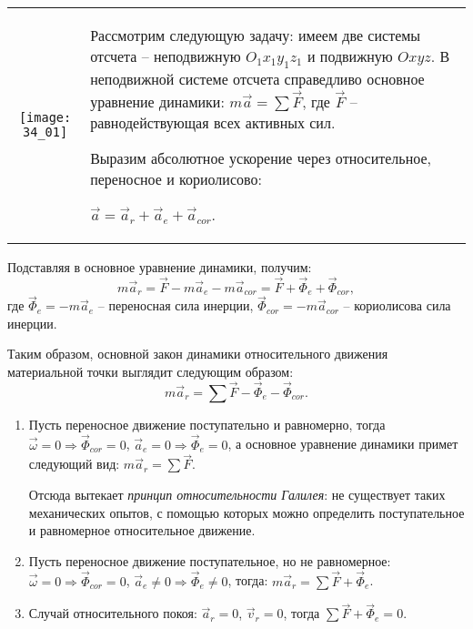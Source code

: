 
\begin{table}[h!]
\begin{tabular}{C{.4}m{.55\textwidth}}
\texttt{[image: 34\_01]} &
Рассмотрим следующую задачу: имеем две системы отсчета -- неподвижную
\( O_1x_1y_1z_1 \) и подвижную \( Oxyz \). В неподвижной системе отсчета
справедливо основное уравнение динамики: \( m\vec{a} = \sum\vec{F} \), где
\( \vec{F} \) -- равнодействующая всех активных сил.

Выразим абсолютное ускорение через относительное, переносное и кориолисово:

\( \vec{a} = \vec{a}_r + \vec{a}_e +\vec{a}_{cor} \). 
\end{tabular}
\end{table}

Подставляя в основное уравнение динамики, получим:
\[
    m\vec{a}_r = \vec{F} - m\vec{a}_e - m\vec{a}_{cor} = \vec{F} +
    \vec{\varPhi}_e + \vec{\varPhi}_{cor},
\]
где \( \vec{\varPhi}_e = -m\vec{a}_e \) -- переносная сила инерции,
\( \vec{\varPhi}_{cor} = -m\vec{a}_{cor} \) -- кориолисова сила инерции.

Таким образом, основной закон динамики относительного движения материальной
точки выглядит следующим образом:
\[
    m\vec{a}_r = \sum\vec{F} - \vec{\varPhi}_e - \vec{\varPhi}_{cor}.
\]

\begin{enumerate}
    \item Пусть переносное движение поступательно и равномерно, тогда
    \( \vec{\omega} = 0 \Rightarrow \vec{\varPhi}_{cor} = 0 \),
    \( \vec{a}_e = 0 \Rightarrow \vec{\varPhi}_e = 0 \), а основное уравнение
    динамики примет следующий вид: \( m\vec{a}_r = \sum\vec{F} \).
    
    Отсюда вытекает \emph{принцип относительности Галилея}: не существует таких
    механических опытов, с помощью которых можно определить поступательное и
    равномерное относительное движение.
    
    \item Пусть переносное движение поступательное, но не равномерное:
    \( \vec{\omega} = 0 \Rightarrow \vec{\varPhi}_{cor} = 0 \),
    \( \vec{a}_e \ne 0 \Rightarrow \vec{\varPhi}_e \ne 0 \), тогда:
    \( m\vec{a}_r = \sum\vec{F} + \vec{\varPhi}_e \).
    
    \item Случай относительного покоя: \( \vec{a}_r = 0 \), \( \vec{v}_r = 0 \),
    тогда \( \sum\vec{F} + \vec{\varPhi}_e = 0 \).
\end{enumerate}

\newpage
